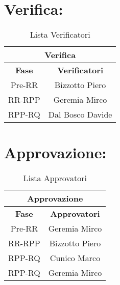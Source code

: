 \section*{\LARGE Verifica:}
 
\begin{table}[!h]
  \begin{center}
    \begin{tabular}
      {|c|c|}
      \hline
      \multicolumn{2}{|c|}{ \textbf{Verifica} } \\
      \hline
      \textbf{Fase} & \textbf{Verificatori} \\
      \hline
      {Pre-RR} & Bizzotto Piero \\
      \hline
      {RR-RPP} & Geremia Mirco \\
      \hline
      {RPP-RQ} & Dal Bosco Davide \\
      \hline
    \end{tabular}
    \caption{Lista Verificatori} %
    \label{tabverifica}
  \end{center}
\end{table}
\textbf{}  

\newpage
\section*{\LARGE Approvazione:}
 
\begin{table}[!h]
  \begin{center}
    \begin{tabular}
      {|c|c|}
      \hline
      \multicolumn{2}{|c|}{ \textbf{Approvazione} } \\
      \hline
      \textbf{Fase} & \textbf{Approvatori} \\
      \hline
      {Pre-RR} & Geremia Mirco \\
      \hline
      {RR-RPP} & Bizzotto Piero\\
      \hline
      {RPP-RQ} & Cunico Marco\\
      \hline
      {RPP-RQ} & Geremia Mirco \\
      \hline
    \end{tabular}
    \caption{Lista Approvatori} %
    \label{tabapprovazione}
  \end{center}
\end{table}
\textbf{}
 
